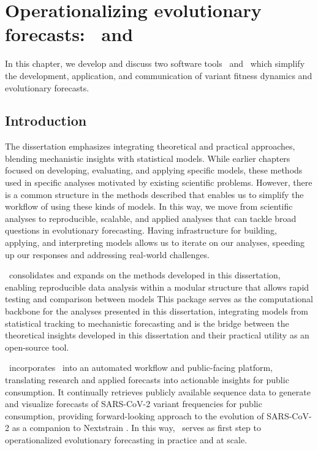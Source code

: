 \graphicspath{{./chapters/operationalizing-forecasts/}}
\chapter{Operationalizing evolutionary forecasts: \evofr\ and \forecastsNcov}

In this chapter, we develop and discuss two software tools \evofr\ and \forecastsNcov\ which simplify the development, application, and communication of variant fitness dynamics and evolutionary forecasts.

\section{Introduction}

The dissertation emphasizes integrating theoretical and practical approaches, blending mechanistic insights with statistical models.
While earlier chapters focused on developing, evaluating, and applying specific models, these methods used in specific analyses motivated by existing scientific problems.
However, there is a common structure in the methods described that enables us to simplify the workflow of using these kinds of models.
In this way, we move from scientific analyses to reproducible, scalable, and applied analyses that can tackle broad questions in evolutionary forecasting. %
Having infrastructure for building, applying, and interpreting models allows us to iterate on our analyses, speeding up our responses and addressing real-world challenges.



\evofr\ consolidates and expands on the methods developed in this dissertation, enabling reproducible data analysis within a modular structure that allows rapid testing and comparison between models %
This package serves as the computational backbone for the analyses presented in this dissertation, integrating models from statistical tracking to mechanistic forecasting and is the bridge between the theoretical insights developed in this dissertation and their practical utility as an open-source tool. 

\forecastsNcov\ incorporates \evofr\ into an automated workflow and public-facing platform, translating research and applied forecasts into actionable insights for public consumption.
It continually retrieves publicly available sequence data to generate and visualize forecasts of SARS-CoV-2 variant frequencies for public consumption, providing forward-looking approach to the evolution of SARS-CoV-2 as a companion to Nextstrain \cite{Hadfield2018}.
In this way, \forecastsNcov\ serves as first step to operationalized evolutionary forecasting in practice and at scale.


